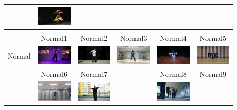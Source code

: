 \begin{table}[t]
\begin{center}
\begin{tabular}{|c|ccc|cc|}
        & \includegraphics[width=17mm]{images/snaps/belly_elegant.png}
      \\ \hline
        &&&&& \\
        & Normal1\cite{ariana} & Normal2\cite{kadokawa} & Normal3\cite{bts} & Normal4\cite{btsgroup} & Normal5\cite{arashi}
      \\
      Normal
        & \includegraphics[width=17mm]{images/snaps/ariana_dance.png}
        & \includegraphics[width=17mm]{images/snaps/kadokawa_dream_dance.png}
        & \includegraphics[width=17mm]{images/snaps/bts_dance.png}
        & \includegraphics[width=17mm]{images/snaps/bts_group_dance.png}
        & \includegraphics[width=17mm]{images/snaps/arashi_group_dance.png}
      \\
      & Normal6\cite{manolo} & Normal7\cite{aito} & & Normal8\cite{hyoga} & Normal9\cite{legit}
      \\
        & \includegraphics[width=17mm]{images/snaps/manolo_dance.png}
        & \includegraphics[width=17mm]{images/snaps/aito_dance.png}
        &
        & \includegraphics[width=17mm]{images/snaps/hyoga_dance.png}

\end{tabular}
\end{center}
\end{table}
